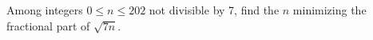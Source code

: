 Among integers $0\le n\le202$ not divisible by 7, find the $n$ minimizing the fractional part of $\sqrt{7n}$.
